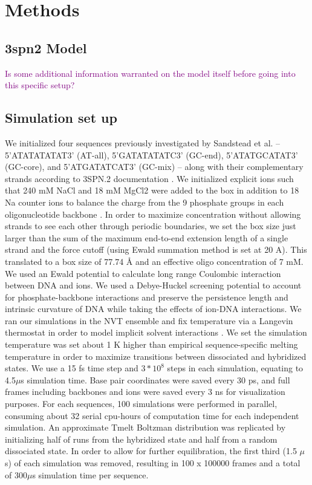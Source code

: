 \documentclass[journal=jpcbfk,manuscript=article]{achemso}
\begin{document}
\section{\label{sec:methods}Methods}

\subsection{\label{sec:methods}3spn2 Model}

\textcolor{purple}{Is some additional information warranted on the model itself before going into this specific setup?}

\subsection{\label{sec:methods}Simulation set up}


We initialized four sequences previously investigated by Sandstead et al. -- 5'ATATATATAT3' (AT-all), 5'GATATATATC3' (GC-end), 5'ATATGCATAT3' (GC-core), and 5'ATGATATCAT3' (GC-mix) -- along with their complementary strands according to 3SPN.2 documentation \citep{Sanstead2016, Phys2014}. We initialized explicit ions such that 240 mM NaCl and 18 mM MgCl2 were added to the box in addition to 18 Na counter ions to balance the charge from the 9 phosphate groups in each oligonucleotide backbone \citep{Hinckley2015}. In order to maximize concentration without allowing strands to see each other through periodic boundaries, we set the box size just larger than the sum of the maximum end-to-end extension length of a single strand and the force cutoff (using Ewald summation method is set at 20 A). This translated to a box size of 77.74 Å and an effective oligo concentration of 7 mM. We used an Ewald potential to calculate long range Coulombic interaction between DNA and ions. We used a Debye-Huckel screening potential to account for phosphate-backbone interactions and preserve the persistence length and intrinsic curvature of DNA while taking the effects of ion-DNA interactions\citep{Hinckley2015}. We ran our simulations in the NVT ensemble and fix temperature via a Langevin thermostat in order to model implicit solvent interactions \citep{Schneider1978Molecular-dynamicsTransitions}. We set the simulation temperature was set about 1 K higher than empirical sequence-specific melting temperature in order to maximize transitions between dissociated and hybridized states. We use a 15 fs time step and $3*10^{8}$ steps in each simulation, equating to 4.5$\mu$s simulation time. Base pair coordinates were saved every 30 ps, and full frames including backbones and ions were saved every 3 ns for visualization purposes. For each sequences, 100 simulations were performed in parallel, consuming about 32 serial cpu-hours of computation time for each independent simulation. An approximate Tmelt Boltzman distribution was replicated by initializing half of runs from the hybridized state and half from a random dissociated state. In order to allow for further equilibration, the first third (1.5 $\mu$s) of each simulation was removed, resulting in 100 x 100000 frames and a total of 300$\mu$s simulation time per sequence.
\end{document}
